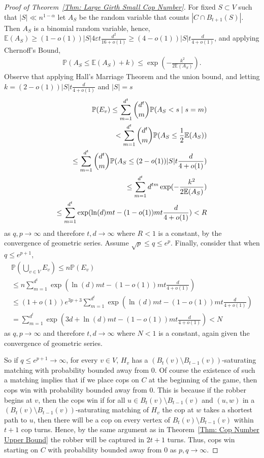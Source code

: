 \documentclass{amsart}
\DeclareMathOperator{\exponential}{exp}
\theoremstyle{definition}
\def\epsilon{\varepsilon}
\begin{document}
\begin{proof}[Proof of Theorem~\ref{Thm: Large Girth Small Cop Number}]
For fixed $S\subset V$ such that $|S| \ll n^{1-\alpha}$ let $A_S$ be the random variable that counts $|C \cap B_{t+1}(S)|$. Then $A_S$ is a binomial random variable, hence, $\mathbb{E}(A_S) \geq (1-o(1)) |S| 4\epsilon t \frac{d^2}{16+o(1)} \geq (4-o(1)) |S| t \frac{d}{4+o(1)}$, and applying Chernoff's Bound, 
\begin{align*} 
\mathbb{P}(A_S \leq \mathbb{E}(A_S) + k) \leq \exponential (- \frac{k^2}{2\mathbb{E}(A_S)}).
\end{align*}
Observe that applying Hall's Marriage Theorem and the union bound, and letting $k =  (2-o(1))|S| t \frac{d}{4+o(1)}$ and $|S| =s$
\begin{align*}
\mathbb{P}(E_v) \leq \sum_{m=1}^{d^t} \dbinom{d^t}{m} \mathbb{P}(A_S < s\mid s = m) \\
< \sum_{m=1}^{d^t} \dbinom{d^t}{m} \mathbb{P}(A_S \leq  \frac{1}{2}\mathbb{E}(A_S)) \\
\leq \sum_{m=1}^{d^t} \dbinom{d^t}{m} \mathbb{P}(A_S \leq  (2-o(1))|S| t \frac{d}{4+o(1)})\\
\leq \sum_{m=1}^{d^t} d^{tm} \exponential (- \frac{k^2}{2\mathbb{E}(A_S)}) \\
\leq \sum_{m=1}^{d^t} \exponential (\ln(d) m t - (1-o(1)) m t \frac{d}{4+o(1)}) < R
\end{align*}
 as $q,p \rightarrow \infty$  and therefore $t,d \rightarrow \infty$ where $R< 1$ is a constant, by the convergence of geometric series. Assume $\sqrt{p}\leq q \leq e^p$. Finally, consider that when $q \leq e^{p+1}$,
\begin{align*}
\mathbb{P}(\bigcup_{v \in V} E_v) \leq n \mathbb{P}(E_v) \\
\leq n \sum_{m=1}^{d^t} \exponential (\ln(d) m t - (1-o(1)) m t \frac{d}{4+o(1)}) \\
\leq (1+o(1))e^{3p+3} \sum_{m=1}^{d^t} \exponential (\ln(d) m t - (1-o(1)) m t \frac{d}{4+o(1)})\\
= \sum_{m=1}^{d^t} \exponential (3d + \ln(d) m t - (1-o(1)) m t \frac{d}{4+o(1)}) < N
\end{align*}
 as $q,p \rightarrow \infty$  and therefore $t,d \rightarrow \infty$ where $N< 1$ is a constant, again given the convergence of geometric series.

So if $q \leq e^{p+1} \rightarrow \infty$, for every $v \in V$, $H_v$ has a $(B_t(v) \setminus B_{t-1}(v))$-saturating matching with probability bounded away from $0$. Of course the existence of such a matching implies that if we place cops on $C$ at the beginning of the game, then cops win with probability bounded away from $0$. This is because if the robber begins at $v$, then the cops win if for all $u \in B_t(v) \setminus B_{t-1}(v)$ and $(u,w)$ in a $(B_t(v) \setminus B_{t-1}(v))$-saturating matching of $H_v$ the cop at $w$ takes a shortest path to $u$, then there will be a cop on every vertex of $B_t(v) \setminus B_{t-1}(v)$ within $t+1$ cop turns. Hence, by the same argument as in Theorem~\ref{Thm: Cop Number Upper Bound} the robber will be captured in $2t+1$ turns. Thus, cops win starting on $C$ with probability bounded away from $0$ as $p,q \rightarrow \infty$.


\end{proof}
\end{document}
